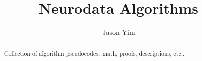 \documentclass[a4paper]{article}
\title{Neurodata Algorithms}
\author{Jason Yim}
\begin{document}
\maketitle
\begin{abstract}
	Collection of algorithm pseudocodes, math, proofs, descriptions, etc..
\end{abstract}
\end{document}
